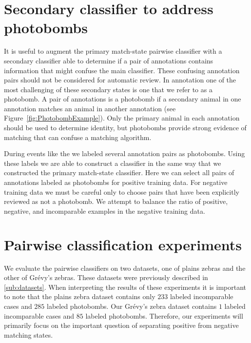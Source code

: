 \section{Secondary classifier to address photobombs}\label{sec:learnpb}
    It is useful to augment the primary match-state pairwise classifier with a secondary classifier able to
      determine if a pair of annotations contains information that might confuse the main classifier.
    These confusing annotation pairs should not be considered for automatic review.
    In annotation one of the most challenging of these secondary states is one that we refer to as a {photobomb}.
    A pair of annotations is a photobomb if a secondary animal in one annotation matches an animal in another
      annotation (\eg see Figure~\ref{fig:PhotobombExample}).
    Only the primary animal in each annotation should be used to determine identity, but photobombs provide
      strong evidence of matching that can confuse a matching algorithm.

    \PhotobombExample{}

    During events like the \GZC{} we labeled several annotation pairs as photobombs.
    Using these labels we are able to construct a classifier in the same way that we constructed the primary
      match-state classifier.
    Here we can select all pairs of annotations labeled as photobombs for positive training data.
    For negative training data we must be careful only to choose pairs that have been explicitly reviewed as not
      a photobomb.
    We attempt to balance the ratio of positive, negative, and incomparable examples in the negative training
      data.

\section{Pairwise classification experiments}\label{sec:pairexpt}

    We evaluate the pairwise classifiers on two datasets, one of plains zebras and the other of Grévy's zebras.
    These datasets were previously described in \cref{sub:datasets}.
    When interpreting the results of these experiments it is important to note that the plains zebra dataset
      contains only $233$ labeled incomparable cases and $285$ labeled photobombs.
    Our Grévy's zebra dataset contains $1$ labeled incomparable cases and $85$ labeled photobombs.
    Therefore, our experiments will primarily focus on the important question of separating positive from
      negative matching states.

